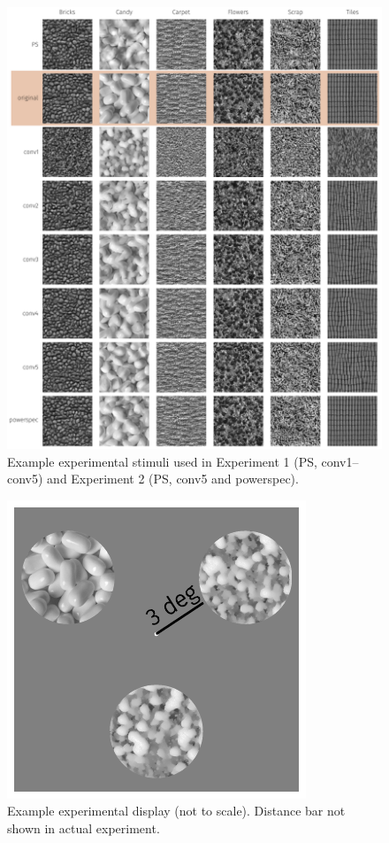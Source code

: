 \documentclass[article, 11pt,a4paper,natbib]{apa6}\usepackage[]{graphicx}\usepackage[]{color}
\begin{document}
\begin{figure}
\centering
\includegraphics[width=\textwidth]{texture_examples.pdf}
\caption{
Example experimental stimuli used in Experiment 1 (PS, conv1--conv5) and Experiment 2 (PS, conv5 and powerspec).
}
\label{fig:stimuli}
\end{figure}


\begin{figure}
\centering
\includegraphics[scale=1]{texture_method.pdf}
\caption{
Example experimental display (not to scale). Distance bar not shown in actual experiment.
}
\label{fig:methods}
\end{figure}
\end{document}
